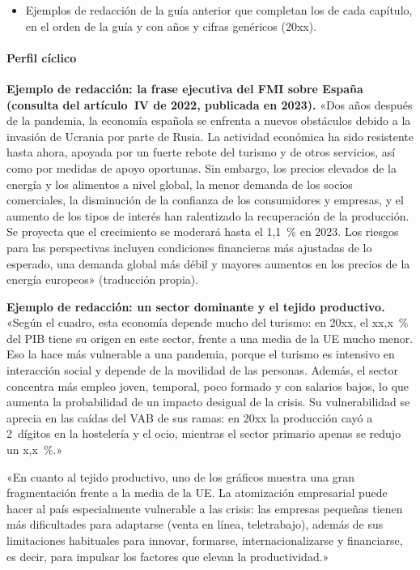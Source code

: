 \documentclass[11pt]{article}
\begin{document}
\begin{itemize}
\item Ejemplos de redacción de la guía anterior que completan los de cada capítulo, en el orden de la guía y con años y cifras genéricos (20xx).
\end{itemize}

\paragraph{Perfil cíclico}
\begin{anotaciones}
\textbf{Ejemplo de redacción: la frase ejecutiva del FMI sobre España (consulta del artículo~IV de 2022, publicada en 2023).}
«Dos años después de la pandemia, la economía española se enfrenta a nuevos obstáculos debido a la invasión de Ucrania por parte de Rusia. La actividad económica ha sido resistente hasta ahora, apoyada por un fuerte rebote del turismo y de otros servicios, así como por medidas de apoyo oportunas. Sin embargo, los precios elevados de la energía y los alimentos a nivel global, la menor demanda de los socios comerciales, la disminución de la confianza de los consumidores y empresas, y el aumento de los tipos de interés han ralentizado la recuperación de la producción. Se proyecta que el crecimiento se moderará hasta el 1,1~\% en 2023. Los riesgos para las perspectivas incluyen condiciones financieras más ajustadas de lo esperado, una demanda global más débil y mayores aumentos en los precios de la energía europeos» \parencite{FMI2023ArticuloIV2022} (traducción propia).
\end{anotaciones}

\begin{anotaciones}
\textbf{Ejemplo de redacción: un sector dominante y el tejido productivo.}
«Según el cuadro, esta economía depende mucho del turismo: en 20xx, el xx,x~\% del PIB tiene su origen en este sector, frente a una media de la UE mucho menor. Eso la hace más vulnerable a una pandemia, porque el turismo es intensivo en interacción social y depende de la movilidad de las personas. Además, el sector concentra más empleo joven, temporal, poco formado y con salarios bajos, lo que aumenta la probabilidad de un impacto desigual de la crisis. Su vulnerabilidad se aprecia en las caídas del VAB de sus ramas: en 20xx la producción cayó a 2~dígitos en la hostelería y el ocio, mientras el sector primario apenas se redujo un x,x~\%.»

«En cuanto al tejido productivo, uno de los gráficos muestra una gran fragmentación frente a la media de la UE. La atomización empresarial puede hacer al país especialmente vulnerable a las crisis: las empresas pequeñas tienen más dificultades para adaptarse (venta en línea, teletrabajo), además de sus limitaciones habituales para innovar, formarse, internacionalizarse y financiarse, es decir, para impulsar los factores que elevan la productividad.»
\end{anotaciones}
\end{document}
